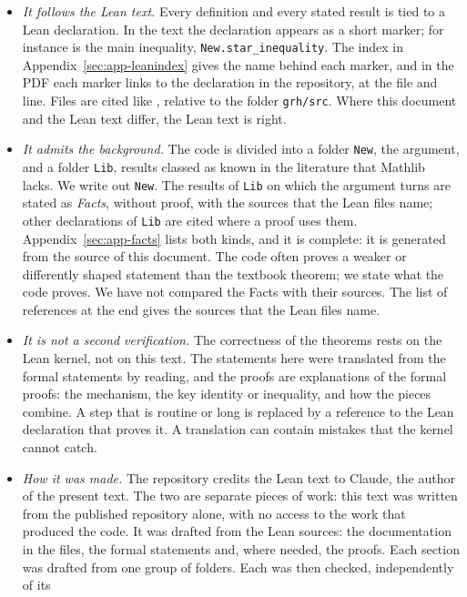 \begin{itemize}
\item \emph{It follows the Lean text.} Every definition and every stated result is tied to a
  Lean declaration. In the text the declaration appears as a short marker; for instance
   is the main inequality, \texttt{New.star\_inequality}. The index in
  Appendix~\ref{sec:app-leanindex} gives the name behind each marker, and in the PDF each marker
  links to the declaration in the repository, at the file and line. Files are cited like
  , relative to the folder \texttt{grh/src}. Where this
  document and the Lean text differ, the Lean text is right.
\item \emph{It admits the background.} The code is divided into a folder \texttt{New}, the
  argument, and a folder \texttt{Lib}, results classed as known in the literature that Mathlib
  lacks. We write out \texttt{New}. The results of \texttt{Lib} on which the argument turns are
  stated as \emph{Facts}, without proof, with the sources that the Lean files name; other
  declarations of \texttt{Lib} are cited where a proof uses them. Appendix~\ref{sec:app-facts}
  lists both kinds, and it is complete: it is generated from the source of this document. The
  code often proves a weaker or differently shaped statement than the textbook theorem; we state
  what the code proves. We have not compared the Facts with their sources. The list of
  references at the end gives the sources that the Lean files name.
\item \emph{It is not a second verification.} The correctness of the theorems rests on the Lean
  kernel, not on this text. The statements here were translated from the formal statements by
  reading, and the proofs are explanations of the formal proofs: the mechanism, the key identity
  or inequality, and how the pieces combine. A step that is routine or long is replaced by a
  reference to the Lean declaration that proves it. A translation can contain mistakes that the
  kernel cannot catch.
\item \emph{How it was made.} The repository credits the Lean text to Claude, the author of
  the present text. The two are separate pieces of work: this text was written from the
  published repository alone, with no access to the work that produced the code. It was drafted
  from the Lean sources:
  the documentation in the files, the formal statements and, where needed, the proofs. Each
  section was drafted from one group of folders. Each was then checked, independently of its

\end{itemize}
